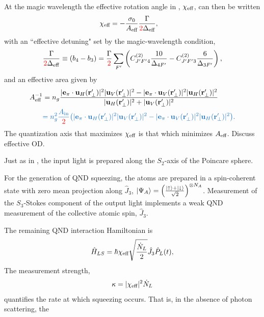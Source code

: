 \documentclass[preprint,aps,pra,onecolumn]{revtex4-1} %
\newcommand{\inp}{{\rm in}}
\newcommand{\change}[1]{{\color{RoyalBlue} #1}}
\newcommand{\comment}[1]{{\color{Maroon} #1}}
\newcommand{\error}[1]{{\color{red} #1}}
\begin{document}
At the magic wavelength the effective rotation angle in , $\chi_{\text{eff}}$, can then be written
	\begin{align}
		\chi_{\eff} %
			& = - \frac{\sigma_0}{A_{\eff}} \frac{\Gamma}{\error{2}\Delta_{\eff}},
	\end{align}
with an ``effective detuning" set by the magic-wavelength condition,
	\begin{align} 
		\frac{\Gamma}{\error{2} \Delta_{\eff}} \equiv (b_4 - b_3) =  \frac{\Gamma}{\error{2}} \sum_{F'}  \left( C^{(2)}_{J'F'4}\frac{10}{\Delta_{4F'}} -  C^{(2)}_{J'F'3}\frac{6}{ \Delta_{3F'} } \right),
	\end{align}
and an effective area given by
	\begin{align}
		A_{\eff}^{-1} & = n_g \frac{ |\mathbf{e}_\pi \cdot \mathbf{u}_H(\br'_\perp) |^2 |\mathbf{u}_V(\br'_\perp)|^2 - |\mathbf{e}_\pi \cdot \mathbf{u}_V(\br'_\perp)|^2 |\mathbf{u}_H(\br'_\perp)|^2}{ |\mathbf{u}_H(\br'_\perp)|^2 + |\mathbf{u}_V(\br'_\perp)|^2 } \\
		& \change{ = n^2_g \frac{A_\inp}{\error{2}} \big( |\mathbf{e}_\pi \cdot \mathbf{u}_H(\br'_\perp) |^2 |\mathbf{u}_V(\br'_\perp)|^2 - |\mathbf{e}_\pi \cdot \mathbf{u}_V(\br'_\perp)|^2 |\mathbf{u}_H(\br'_\perp)|^2 \big). }
	\end{align}	
The quantization axis that maximizes $\chi_{\text{eff}}$ is that which minimizes $A_{\text{eff}}$.  \comment{Discuss effective OD}.

Just as in , the input light is prepared along the $S_2$-axis of the Poincare sphere. 

For the generation of QND squeezing, the atoms are prepared in a spin-coherent state with zero mean projection along $\hat{J}_3$, $ \lvert{\Psi_A}\rangle=\left(\frac{\lvert{\uparrow}\rangle+\lvert{\downarrow}\rangle}{\sqrt{2}}\right)^{\otimes N_A} $. Measurement of the $S_3$-Stokes component of the output light implements a weak QND measurement of the collective atomic spin, $ \hat{J}_3 $. 

The remaining QND interaction Hamiltonian is
	\begin{equation} \label{Eq::FaradayHam}
		\hat{H}_{LS} = \hbar \chi_{\text{eff}} \sqrt{ \frac{\dot{N}_L}{2}} \hat{J}_3 \hat{P}_L(t),
	\end{equation}
The measurement strength, 
	\begin{align}
		\kappa = |\chi_{\text{eff}}|^2 \dot{N}_L 
	\end{align}
quantifies the rate at which squeezing occurs.  That is, in the absence of photon scattering, the 
\end{document}
